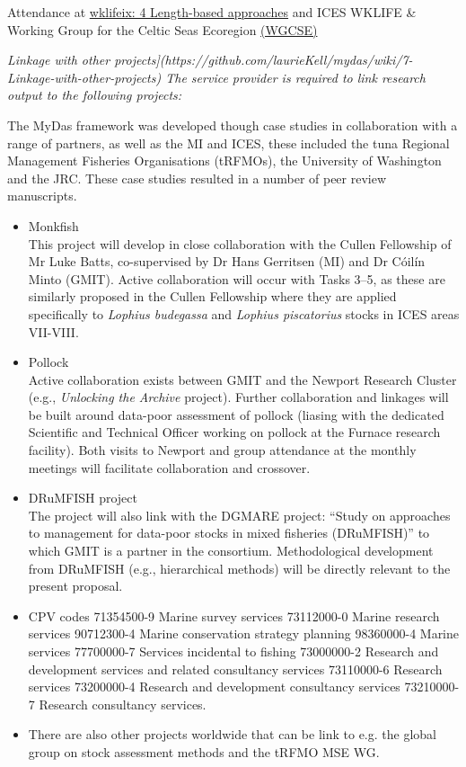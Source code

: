 Attendance at \href{http://ices.dk/sites/pub/Publication Reports/Expert Group Report/Fisheries Resources Steering Group/2019/WKLIFEIX/WKLIFE_IX_2019.pdf#page=30}{wklifeix: 4 Length-based approaches} and 
ICES WKLIFE \& Working Group for the Celtic Seas Ecoregion \href{https://www.ices.dk/community/groups/Pages/WGCSE.aspx}{(WGCSE)}


\textit{Linkage with other projects](https://github.com/laurieKell/mydas/wiki/7-Linkage-with-other-projects) The service provider is required to link research output to the following projects: }

The MyDas framework was developed though case studies in collaboration with a range of partners, as well as the MI and ICES, these included the tuna Regional Management Fisheries Organisations (tRFMOs), the University of Washington and the JRC. These case studies resulted in a number of peer review manuscripts. 

\begin{itemize}
 \item Monkfish\\
 This project will develop in close collaboration with the Cullen Fellowship of Mr Luke Batts, co-supervised by Dr Hans Gerritsen (MI) and Dr C\'oil\'in Minto (GMIT). Active collaboration will occur with Tasks 3--5, as these are similarly proposed in the Cullen Fellowship where they are applied specifically to \textit{Lophius budegassa} and \textit{Lophius piscatorius} stocks in ICES areas VII-VIII.
 \item Pollock \\
 Active collaboration exists between GMIT and the Newport Research Cluster (e.g., \emph{Unlocking the Archive} project). Further collaboration and linkages will be built around data-poor assessment of pollock (liasing with the dedicated Scientific and Technical Officer working on pollock at the Furnace research facility). Both visits to Newport and group attendance at the monthly meetings will facilitate collaboration and crossover.
 \item DRuMFISH project \\
 The project will also link with the DGMARE project: ``Study on approaches to management for data-poor stocks in mixed fisheries (DRuMFISH)'' to which GMIT is a partner in the consortium. Methodological development from DRuMFISH (e.g., hierarchical methods) will be directly relevant to the present proposal. 
 \item CPV codes 71354500-9 Marine survey services 73112000-0 Marine research services 90712300-4 Marine conservation strategy planning 98360000-4 Marine services 77700000-7 Services incidental to fishing 73000000-2 Research and development services and related consultancy services 73110000-6 Research services 73200000-4 Research and development consultancy services 73210000-7 Research consultancy services.
 \item There are also other projects worldwide that can be link to e.g. the global group on stock assessment methods and the tRFMO MSE WG. 
 \end{itemize}

